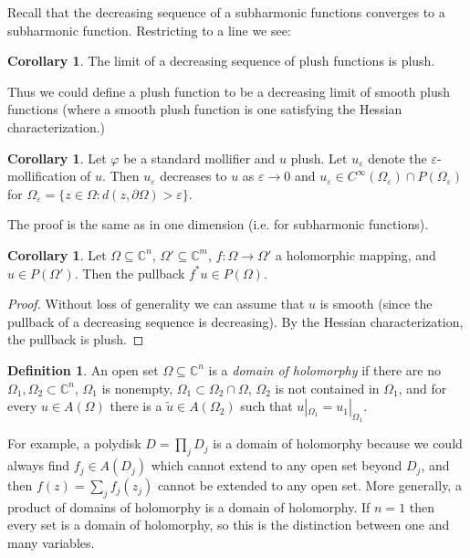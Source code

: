 \documentclass[12pt]{report}
\newcommand{\CC}{\mathbb{C}}
\newcommand{\dfn}[1]{\emph{#1}\index{#1}}
\theoremstyle{definition}
\newtheorem{corollary}[theorem]{Corollary}
\newtheorem{definition}[theorem]{Definition}
\begin{document}
Recall that the decreasing sequence of a subharmonic functions converges to a subharmonic function. Restricting to a line we see:
\begin{corollary}
    The limit of a decreasing sequence of plush functions is plush.
\end{corollary}
    Thus we could define a plush function to be a decreasing limit of smooth plush functions (where a smooth plush function is one satisfying the Hessian characterization.)

\begin{corollary}
Let $\varphi$ be a standard mollifier and $u$ plush. Let $u_\varepsilon$ denote the $\varepsilon$-mollification of $u$. Then $u_\varepsilon$ decreases to $u$ as $\varepsilon \to 0$ and $u_\varepsilon \in C^\infty(\Omega_\varepsilon) \cap P(\Omega_\varepsilon)$ for $\Omega_\varepsilon = \{z \in \Omega: d(z, \partial \Omega) > \varepsilon\}$.
\end{corollary}
The proof is the same as in one dimension (i.e. for subharmonic functions).

\begin{corollary}
    Let $\Omega \subseteq \CC^n$, $\Omega' \subseteq \CC^m$, $f: \Omega \to \Omega'$ a holomorphic mapping, and $u \in P(\Omega')$. Then the pullback $f^*u \in P(\Omega)$.
\end{corollary}
\begin{proof}
    Without loss of generality we can assume that $u$ is smooth (since the pullback of a decreasing sequence is decreasing). By the Hessian characterization, the pullback is plush.
\end{proof}


\begin{definition}
    An open set $\Omega \subseteq \CC^n$ is a \dfn{domain of holomorphy} if there are no $\Omega_1, \Omega_2 \subset \CC^n$, $\Omega_1$ is nonempty, $\Omega_1 \subset \Omega_2 \cap \Omega$, $\Omega_2$ is not contained in $\Omega_1$, and for every $u \in A(\Omega)$ there is a $\tilde u \in A(\Omega_2)$ such that $u|_{\Omega_1} = u_1|_{\Omega_1}$.
\end{definition}
    For example, a polydisk $D = \prod_j D_j$ is a domain of holomorphy because we could always find $f_j \in A(D_j)$ which cannot extend to any open set beyond $D_j$, and then $f(z) = \sum_j f_j(z_j)$ cannot be extended to any open set. More generally, a product of domains of holomorphy is a domain of holomorphy. If $n = 1$ then every set is a domain of holomorphy, so this is the distinction between one and many variables.
\end{document}
